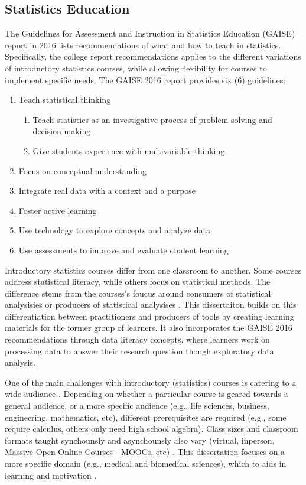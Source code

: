 \documentclass[010-intro.tex]{subfiles}
\begin{document}
\subsection{Statistics Education}

The Guidelines for Assessment and Instruction in Statistics Education (GAISE) report in 2016 lists
recommendations of what and how to teach in statistics.
Specifically, the college report recommendations
applies to the different variations of introductory statistics courses,
while allowing flexibility for courses to implement specific needs.
The GAISE 2016 report provides six (6) guidelines:

\begin{enumerate}
    \item Teach statistical thinking
    \begin{enumerate}
        \item Teach statistics as an investigative process of problem-solving and decision-making
        \item Give students experience with multivariable thinking
    \end{enumerate}
    \item Focus on conceptual understanding
    \item Integrate real data with a context and a purpose
    \item Foster active learning
    \item Use technology to explore concepts and analyze data
    \item Use assessments to improve and evaluate student learning
\end{enumerate}

Introductory statistics courses differ from one classroom to another.
Some courses address statistical literacy,
while others focus on statistical methods.
The difference stems from the courses's foucus around consumers of statistical analysisies
or producers of statistical analysises
\cite{gaise2016}.
This dissertaiton builds on this differentiation between practitioners and producers of tools
by creating learning materials for the former group of learners.
It also incorporates the GAISE 2016 recommendations through data literacy concepts,
where learners work on processing data to answer their research question though exploratory data analysis.

One of the main challenges with introductory (statistics) courses is catering to a wide audiance
\cite{gaise2016}.
Depending on whether a particular course is geared towards a general audience, or a more specific audience
(e.g., life sciences, business, engineering, mathematics, etc),
different prerequisites are required
(e.g., some require calculus, others only need high school algebra).
Class sizes and classroom formats taught synchounsly and asynchounsly also vary
(virtual, inperson, Massive Open Online Courses - MOOCs, etc)
\cite{gaise2016}.
This dissertation focuses on a more specific domain (e.g., medical and biomedical sciences),
which to aids in learning and motivation
\cite{ambrose2010learning, wilson2019teaching, krossDemocratizationDataScience2020}.
\end{document}

